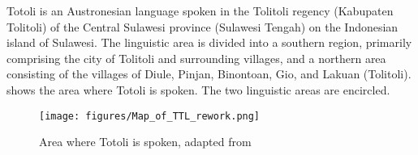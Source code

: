 Totoli is an Austronesian language spoken in the Tolitoli regency (Kabupaten Tolitoli) of the Central Sulawesi province (Sulawesi Tengah) on the Indonesian island of Sulawesi. The linguistic area is divided into a southern region, primarily comprising the city of Tolitoli and surrounding villages, and a northern area consisting of the villages of Diule, Pinjan, Binontoan, Gio, and Lakuan (Tolitoli).   shows the area where Totoli is spoken. The two linguistic areas are encircled. 


\begin{figure}
	\texttt{[image: figures/Map\_of\_TTL\_rework.png]}
	\caption{Area where Totoli is spoken, adapted from \citet[29]{himmelmann_source_book}}
	\label{Map of Totoli}
\end{figure}



